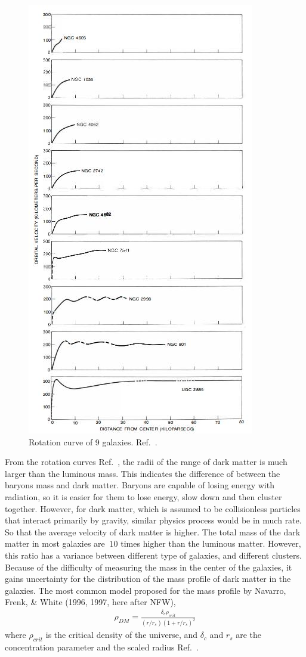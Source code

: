 \begin{figure}
	\centering
	\includegraphics[width=0.7 \textwidth]{Figures/Intro/RotationCurveRubin.jpg}
	\caption[Rotation curve]{Rotation curve of 9 galaxies. Ref.~\cite{Rubin1983}.}
	\label{fig:rotationCurves}
\end{figure}

From the rotation curves Ref.~\cite{Rubin1983, Begeman1991}, the radii of the range of dark matter is much larger than the luminous mass. This indicates the difference of between the baryons mass and dark matter. Baryons are capable of losing energy with radiation, so it is easier for them to lose energy, slow down and then cluster together. However, for dark matter, which is assumed to be collisionless particles that interact primarily by gravity, similar physics process would be in much rate. So that the average velocity of dark matter is higher. The total mass of the dark matter in most galaxies are $~10$ times higher than the luminous matter. However, this ratio has a variance between different type of galaxies, and different clusters. Because of the difficulty of measuring the mass in the center of the galaxies, it gains uncertainty for the distribution of the mass profile of dark matter in the galaxies. The most common model proposed for the mass profile by Navarro, Frenk, \& White (1996, 1997, here after NFW),
\begin{align}
\rho_{DM}= \frac{\delta_c \rho_{crit}}{(r/r_s)(1+r/r_s)^2}
\end{align}
where $\rho_{crit}$ is the critical density of the universe, and $\delta_c$ and $r_s$ are the concentration parameter and the scaled radius Ref.~\cite{Navarro1996, Navarro1997}. 

